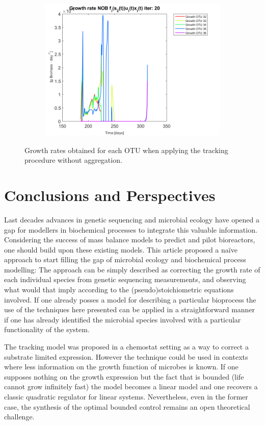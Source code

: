 \documentclass[3p,times]{article}
\begin{document}
\begin{figure}[h]
\begin{subfigure}{0.45 \textwidth}
	\includegraphics[width =\textwidth]{Application//200407_iter_20_growth_control_NOB_plot_1}
	\end{subfigure}
	\caption{Growth rates obtained for each OTU when applying the tracking procedure without aggregation.}
	\label{growth all}
\end{figure}


\clearpage
\section{Conclusions and Perspectives}

Last decades advances in genetic sequencing and microbial ecology have opened a gap for modellers in biochemical processes to integrate this valuable information. Considering the success of mass balance models to predict and pilot bioreactors, one should build upon these existing models. This article proposed a naïve approach to start filling the gap of microbial ecology and biochemical process modelling: The approach can be simply described as correcting the growth rate of each individual species from genetic sequencing measurements, and observing what would that imply according to the (pseudo)stoichiometric equations involved. If one already posses a model for describing a particular bioprocess the use of the techniques here presented can be applied in a straightforward manner if one has already identified the microbial species involved with a particular functionality of the system.

The tracking model was proposed  in a chemostat setting as a way to correct a substrate limited expression. However the technique could be used in contexts where less information on the growth function of microbes is known. If one supposes nothing on the growth expression but the fact that is bounded (life cannot grow infinitely fast) the model becomes a linear model and one recovers a classic quadratic regulator for linear systems. Nevertheless, even in the former case, the synthesis of the optimal bounded control remains an open theoretical challenge.
\end{document}
